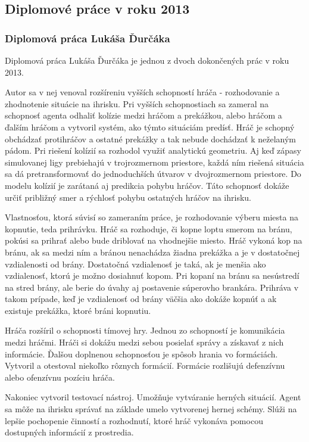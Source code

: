 \subsection{Diplomové práce v roku 2013}
\subsubsection{Diplomová práca Lukáša Ďurčáka} \label{sec_durcak}

Diplomová práca Lukáša Ďurčáka\cite{durcak} je jednou z dvoch dokončených prác v roku 2013.

Autor sa v nej venoval rozšíreniu vyšších schopností hráča - rozhodovanie a zhodnotenie situácie na ihrisku. Pri vyšších schopnostiach sa zameral na schopnosť agenta odhaliť kolízie medzi hráčom a prekážkou, alebo hráčom a ďalším hráčom a vytvoril systém, ako týmto situáciám predísť. Hráč je schopný obchádzať protihráčov a ostatné prekážky a tak nebude dochádzať k neželaným pádom. Pri riešení kolízií sa rozhodol využiť analytickú geometriu. Aj keď zápasy simulovanej ligy prebiehajú v trojrozmernom priestore, každá ním riešená situácia sa dá pretransformovať do jednoduchších útvarov v dvojrozmernom priestore. Do modelu kolízií je zarátaná aj predikcia pohybu hráčov. Táto schopnosť dokáže určiť približný smer a rýchlosť pohybu ostatných hráčov na ihrisku. 

Vlastnosťou, ktorá súvisí so zameraním práce, je rozhodovanie výberu miesta na kopnutie, teda prihrávku. Hráč sa rozhoduje, či kopne loptu smerom na bránu, pokúsi sa prihrať alebo bude driblovať na vhodnejšie miesto. Hráč vykoná kop na bránu, ak sa medzi ním a bránou nenachádza žiadna prekážka a je v dostatočnej vzdialenosti od brány. Dostatočná vzdialenosť je taká, ak je menšia ako vzdialenosť, ktorú je možno dosiahnuť kopom. Pri kopaní na bránu sa nesústredí na stred brány, ale berie do úvahy aj postavenie súperovho brankára. Prihráva v takom prípade, keď je vzdialenosť od brány väčšia ako dokáže kopnúť a ak existuje prekážka, ktoré bráni kopnutiu.

Hráča rozšíril o schopnosti tímovej hry. Jednou zo schopností je komunikácia medzi hráčmi. Hráči si dokážu medzi sebou posielať správy a získavať z nich informácie. Ďalšou doplnenou schopnosťou je spôsob hrania vo formáciách. Vytvoril a otestoval niekoľko rôznych formácií. Formácie rozlišujú defenzívnu alebo ofenzívnu pozíciu hráča.

Nakoniec vytvoril testovací nástroj. Umožňuje vytváranie herných situácií. Agent sa môže na ihrisku správať na základe umelo vytvorenej hernej schémy. Slúži na lepšie pochopenie činností a rozhodnutí, ktoré hráč vykonáva pomocou dostupných informácií z prostredia.